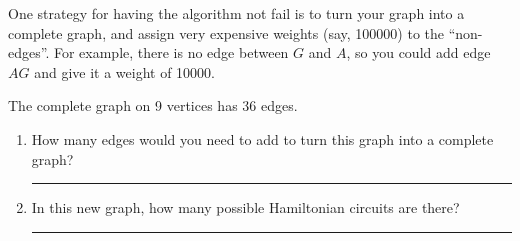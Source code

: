 \documentclass[12pt]{article}
\newcommand{\ans}[1][1in]{\rule{#1}{.5pt}}
\begin{document}
\vspace{1cm}
%
 \hfill



One strategy for having the algorithm not fail is to turn your graph into a complete graph, and assign very expensive weights (say, 100000) to the ``non-edges''. For example, there is no edge between $G$ and $A$, so you could add edge $AG$ and give it a weight of 10000.

The complete graph on 9 vertices has 36 edges. 
\begin{enumerate}
\item How many edges would you need to add to turn this graph into a complete graph? \ans
\item In this new graph, how many possible Hamiltonian circuits are there? \ans
\end{enumerate}
\end{document}
